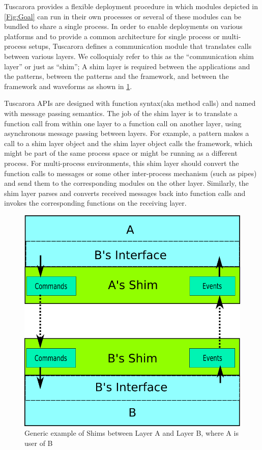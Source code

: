 

Tuscarora provides a flexible deployment procedure in which modules depicted in \cref{Fig:Goal} can run in their own processes or several of these modules can be bundled to share a single process. 
In order to enable deployments on various platforms and 
to provide a common architecture for single process or multi-process setups, 
Tuscarora defines a communication module that translates calls between various layers. We colloquialy refer to this as the ``communication shim layer'' or just as ``shim''; 
A shim layer is required  between the applications and the patterns, between the patterns and the framework, and between the framework and waveforms as shown in \cref{fig:CommonShimLayerInterface}.

Tuscarora APIs are designed with function syntax(aka method calls) and named with message passing semantics.
The job of the shim layer is to translate a function call from within one layer to a function call on another layer, using asynchronous message passing between layers.
For example, a pattern makes a call to a shim layer object and the shim layer object calls the framework, which might be part of the same process space or might be running as a different process. For multi-process environments,
this shim layer should convert the function calls to messages or some other inter-process mechanism (such as pipes) and send them to the corresponding modules on the other layer.
Similarly, the shim layer parses and converts received messages back into function calls and invokes the corresponding functions on the receiving layer.

\begin{figure}[ht]
	\centering
	\includegraphics[width=0.3\linewidth]{figures/CommonShimLayerInterface}
	\caption{Generic example of Shims between Layer A and Layer B, where A is user of B}
	\label{fig:CommonShimLayerInterface}
\end{figure}


